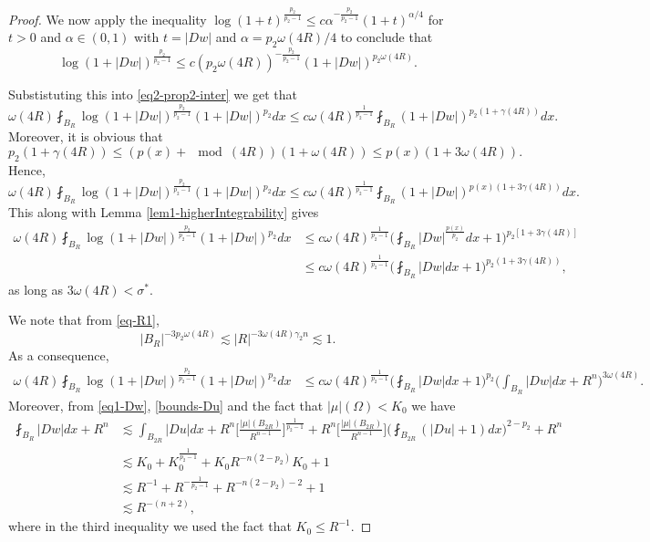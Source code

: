 \documentclass[a4paper,10pt]{amsart}
\newcommand{\lesi}{\lesssim}
\newcommand{\px}{p(x)}
\newcommand{\f}{\frac}
\newcommand{\om}{\omega}
\newcommand{\Om}{\Omega}
\begin{document}
\begin{proof}
	We now apply the inequality $\log(1+t)^{\f{p_2}{p_2-1}}\leq c\alpha^{-\f{p_2}{p_2-1}}(1+t)^{\alpha/4}$ for $t>0$ and $\alpha\in (0,1)$ with $t=|Dw|$ and $\alpha= p_2\om(4R)/4$ to conclude that
	$$
	\log(1+|Dw|)^{\f{p_2}{p_2-1}}\leq c(p_2\om(4R))^{-\f{p_2}{p_2-1}}(1+|Dw|)^{p_2\om(4R)}.
	$$	
	
	
	Substistuting this into \eqref{eq2-prop2-inter} we get that 
	$$
	\om(4R)\fint_{B_{R}} \log(1+|Dw|)^{\f{p_2}{p_2-1}}(1+|Dw|)^{p_2}dx\leq c\om(4R)^{\f{1}{p_2-1}}\fint_{B_{R}}(1+|Dw|)^{p_2(1+\gamma(4R))}dx.
$$
Moreover, it is obvious that 
$$
p_2(1+\gamma(4R))\leq (p(x)+\mod{(4R)})(1+\om(4R))\leq p(x)(1+3\om(4R)).
$$
Hence,
$$
\om(4R)\fint_{B_{R}} \log(1+|Dw|)^{\f{p_2}{p_2-1}}(1+|Dw|)^{p_2}dx\leq c\om(4R)^{\f{1}{p_2-1}}\fint_{B_{R}}(1+|Dw|)^{p(x)(1+3\gamma(4R))}dx.
$$	
This along with Lemma \ref{lem1-higherIntegrability} gives
\begin{equation}\label{eq-estimate p2}
\begin{aligned}
\om(4R)\fint_{B_{R}} \log(1+|Dw|)^{\f{p_2}{p_2-1}}(1+|Dw|)^{p_2}dx&\leq c\om(4R)^{\f{1}{p_2-1}}\Big(\fint_{B_{R}}|Dw|^{\f{\px}{p_2}}dx+1\Big)^{p_2[1+3\gamma(4R)]}\\	
	&\leq c\om(4R)^{\f{1}{p_2-1}}\Big(\fint_{B_{R}}|Dw|dx+1\Big)^{p_2(1+3\gamma(4R))},
	\end{aligned}
	\end{equation}
	as long as $3\om(4R)<\sigma^*$.
	
	
	We note that from \eqref{eq-R1}, 
	$$
	|B_R|^{-3p_2\omega(4R)}\lesi |R|^{-3\omega(4R) \gamma_2 n}\lesi 1. 
	$$
	As a consequence,
	\begin{equation}\label{eq2s-estimate p2}
	\begin{aligned}
	\omega(4R)\fint_{B_{R}} \log(1+|Dw|)^{\f{p_2}{p_2-1}}(1+|Dw|)^{p_2}dx&\leq c\om(4R)^{\f{1}{p_2-1}}\Big(\fint_{B_{R}}|Dw|dx+1\Big)^{p_2}\Big(\int_{B_{R}}|Dw|dx+R^n\Big)^{3\om(4R)}.
	\end{aligned}
	\end{equation}
	Moreover, from \eqref{eq1-Dw}, \eqref{bounds-Du} and the fact that $|\mu|(\Om)< K_0$ we have
	$$
	\begin{aligned}
	\fint_{B_{R}}|Dw|dx+R^n&\lesi \int_{B_{2R}}|Du| dx+R^n\Big[\f{|\mu|(B_{2R})}{R^{n-1}}\Big]^{\f{1}{p_2-1}} +R^n\Big[\f{|\mu|(B_{2R})}{R^{n-1}}\Big]\Big(\fint_{B_{2R}}(|Du|+1)dx\Big)^{2-p_2}+R^n\\
	&\lesi K_0 + K_0^{\f{1}{p_2-1}}+K_0 R^{-n(2-p_2)}K_0+1\\
	&\lesi R^{-1} + R^{-\f{1}{p_2-1}}+R^{-n(2-p_2)-2}+1\\
	&\lesi R^{-(n+2)},
	\end{aligned}
	$$
	where in the third inequality we used the fact that $K_0\leq R^{-1}$.
	

\end{proof}
\end{document}
